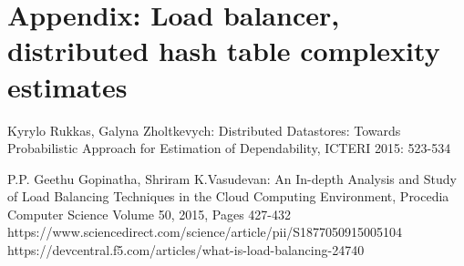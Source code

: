 \documentclass{report}
\begin{document}
\chapter{Appendix: Load balancer, distributed hash table complexity estimates}
\begin{thebibliography}{00}

Kyrylo Rukkas, Galyna Zholtkevych:
Distributed Datastores: Towards Probabilistic Approach for Estimation of Dependability,
ICTERI 2015: 523-534


P.P. Geethu Gopinatha, Shriram K.Vasudevan:
An In-depth Analysis and Study of Load Balancing Techniques in the Cloud Computing Environment, Procedia Computer Science Volume 50, 2015, Pages 427-432
https://www.sciencedirect.com/science/article/pii/S1877050915005104
https://devcentral.f5.com/articles/what-is-load-balancing-24740



\end{thebibliography}
\end{document}
